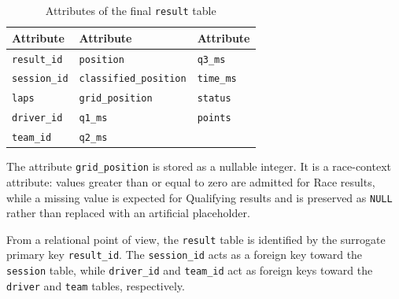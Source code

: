 \documentclass[12pt,a4paper]{article}
\begin{document}
	\begin{table}[H]
		\centering
		\caption{Attributes of the final \texttt{result} table}
		\renewcommand{\arraystretch}{1.15}
		\begin{tabularx}{0.95\textwidth}{>{\raggedright\arraybackslash}X >{\raggedright\arraybackslash}X >{\raggedright\arraybackslash}X}
			\toprule
			\textbf{Attribute} & \textbf{Attribute} & \textbf{Attribute} \\
			\midrule
			\texttt{result\_id}            & \texttt{position}              & \texttt{q3\_ms} \\
			\texttt{session\_id}         & \texttt{classified\_position}  & \texttt{time\_ms} \\
			\texttt{laps}                & \texttt{grid\_position}        & \texttt{status} \\
			\texttt{driver\_id}            & \texttt{q1\_ms}                & \texttt{points} \\
			\texttt{team\_id}              & \texttt{q2\_ms}                &  \\
			\bottomrule
		\end{tabularx}
	\end{table}

	The attribute \texttt{grid\_position} is stored as a nullable integer. It is a
	race-context attribute: values greater than or equal to zero are admitted for
	Race results, while a missing value is expected for Qualifying results and is
	preserved as \texttt{NULL} rather than replaced with an artificial placeholder.
	
	From a relational point of view, the \texttt{result} table is identified by the surrogate primary key \texttt{result\_id}.
	The \texttt{session\_id} acts as a foreign key toward the \texttt{session} table, while \texttt{driver\_id} and \texttt{team\_id} act as foreign keys toward the \texttt{driver} and \texttt{team} tables, respectively.
	
\end{document}

